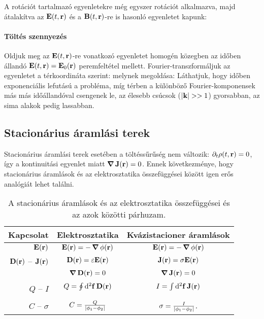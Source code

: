    A rotációt tartalmazó egyenletekre még egyszer rotációt alkalmazva, majd átalakítva az $\mathbf{E}(t,\mathbf{r})$ és a $\mathbf{B}(t,\mathbf{r})$-re is hasonló egyenletet kapunk:
   \paragraph{Töltés szennyezés}
    Oldjuk meg az $\mathbf{E}(t,\mathbf{r})$-re vonatkozó egyenletet homogén közegben az időben állandó $\mathbf{E}(t,\mathbf{r})=\mathbf{E}_0(\mathbf{r})$ peremfeltétel mellett. Fourier-transzformáljuk az egyenletet a térkoordináta szerint:
    melynek megoldása:
    Láthatjuk, hogy időben exponenciális lefutású a probléma, míg térben a különböző Fourier-kom\-po\-nen\-sek más más időállandóval csengenek le, az élesebb csúcsok ($\left\lvert\mathbf{k}\right\rvert>>1$) gyorsabban, az sima alakok pedig lassabban. 
    
  \subsection{Stacionárius áramlási terek}
   
   Stacionárius áramlási terek esetében a töltéssűrűség nem változik: $\partial_t\rho(t,\mathbf{r})=0$, így a kontinuitási egyenlet miatt $\mathop{\boldsymbol{\nabla}}\nolimits{\mathbf{J}(\mathbf{r})}=0$. Ennek következménye, hogy stacionárius áramlások és az elektrosztatika összefüggései között igen erős analógiát lehet találni.
   \begin{table}[h!]
    \centering
    \begin{tabular}{r||c|c}
     Kapcsolat & Elektrosztatika & Kvázistacioner áramlások \\ \hline
     $\mathbf{E}(\mathbf{r})$ & $\mathbf{E}(\mathbf{r})=-\mathop{\boldsymbol{\nabla}}\nolimits{\phi(\mathbf{r})}$ & $\mathbf{E}(\mathbf{r})=-\mathop{\boldsymbol{\nabla}}\nolimits{\phi(\mathbf{r})}$ \\
     $\mathbf{D}(\mathbf{r})$ -- $\mathbf{J}(\mathbf{r})$ & $\mathbf{D}(\mathbf{r})=\varepsilon\mathbf{E}(\mathbf{r})$ & $\mathbf{J}(\mathbf{r})=\sigma\mathbf{E}(\mathbf{r})$ \\
      & $\mathop{\boldsymbol{\nabla}}\nolimits{\mathbf{D}(\mathbf{r})}=0$ & $\mathop{\boldsymbol{\nabla}}\nolimits{\mathbf{J}(\mathbf{r})}=0$ \\
     $Q$ -- $I$ & $Q=\oint\limits_{}^{}\mathrm{d}^2\mathbf{f}\,\mathbf{D}(\mathbf{r})$ & $I=\int\limits_{}^{}\mathrm{d}^2\mathbf{f}\,\mathbf{J}(\mathbf{r})$ \\
     $C$ -- $\sigma$ & $C=\frac{Q}{\left\lvert\phi_1-\phi_2\right\rvert}$ & $\sigma=\frac{I}{\left\lvert\phi_1-\phi_2\right\rvert}$. \\
    \end{tabular}
    \caption{A stacionárius áramlások és az elektrosztatika összefüggései és az azok közötti párhuzam.}\label{tabl:08-stacstat}
   \end{table}
   
